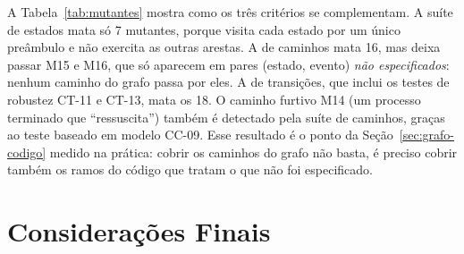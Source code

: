 \documentclass[11pt,a4paper]{article}
\theoremstyle{definition}
\begin{document}
A Tabela~\ref{tab:mutantes} mostra como os três critérios se complementam. A suíte de estados mata
só 7 mutantes, porque visita cada estado por um único preâmbulo e não exercita as outras arestas. A
de caminhos mata 16, mas deixa passar M15 e M16, que só aparecem em pares (estado, evento)
\emph{não especificados}: nenhum caminho do grafo passa por eles. A de transições, que inclui os
testes de robustez CT-11 e CT-13, mata os 18. O caminho furtivo M14 (um processo terminado que
``ressuscita'') também é detectado pela suíte de caminhos, graças ao teste baseado em modelo CC-09.
Esse resultado é o ponto da Seção~\ref{sec:grafo-codigo} medido na prática: cobrir os caminhos do
grafo não basta, é preciso cobrir também os ramos do código que tratam o que não foi especificado.

\section{Considerações Finais}\label{sec:finais}
\end{document}
